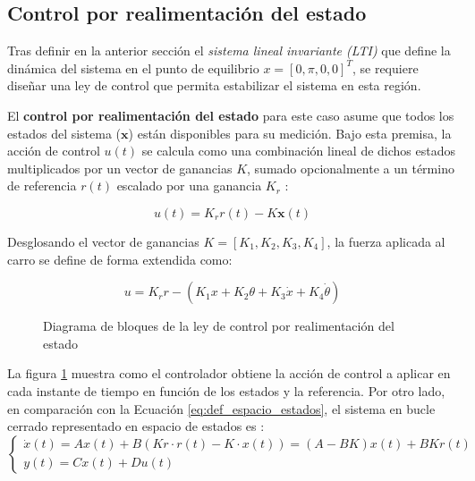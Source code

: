 \documentclass[11pt,fleqn]{book} %
\begin{document}
\newpage

\subsection{Control por realimentación del estado}
\label{cap:control_kx}

Tras definir en la anterior sección el \textit{sistema lineal invariante (LTI)} que define la dinámica del sistema en el punto de equilibrio $x = [0, \pi, 0, 0]^T$, se requiere diseñar una ley de control que permita estabilizar el sistema en esta región. 

El \textbf{control por realimentación del estado} para este caso asume que todos los estados del sistema ($\mathbf{x}$) están disponibles para su medición. Bajo esta premisa, la acción de control $u(t)$ se calcula como una combinación lineal de dichos estados multiplicados por un vector de ganancias $K$, sumado opcionalmente a un término de referencia $r(t)$ escalado por una ganancia $K_r$ \cite{Penarrocha_Tema8}:

\begin{equation}
	u(t) = K_r r(t) - K \mathbf{x}(t)
	\label{eq:ley_control_realimentacion}
\end{equation}

Desglosando el vector de ganancias $K = [K_1, K_2, K_3, K_4]$, la fuerza aplicada al carro se define de forma extendida como:

\begin{equation}
	u = K_r r - (K_1 x + K_2 \theta + K_3 \dot{x} + K_4 \dot{\theta})
	\label{eq:ley_control_realimentacion_exten}
\end{equation}


\begin{figure}[ht]
	\centering
	\resizebox{\textwidth}{!}{%
		
	}
	\caption{Diagrama de bloques de la ley de control por realimentación del estado}
	\label{fig:control_SS}
\end{figure}

La figura \ref{fig:control_SS} muestra como el controlador obtiene la acción de control a aplicar en cada instante de tiempo en función de los estados y la referencia. Por otro lado, en comparación con la Ecuación \ref{eq:def_espacio_estados}, el sistema en bucle cerrado representado en espacio de estados es \cite{Penarrocha_Tema8}:
\begin{equation}
	\begin{cases}
		\dot{x}(t) = Ax(t) + B(Kr\cdot r(t) - K \cdot x(t)) = (A -BK)x(t) + BKr(t)\\
		y(t) = Cx(t) + Du(t)
	\end{cases}\label{eq:def_espacio_estados_BC}
\end{equation}
\end{document}
